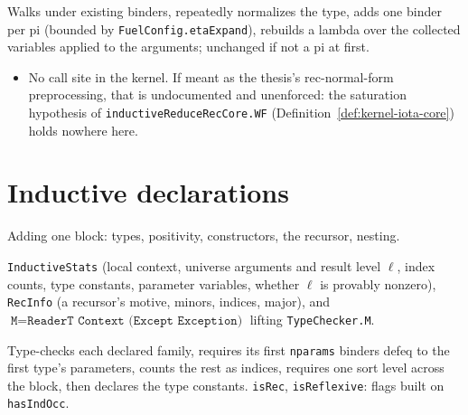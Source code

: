 \begin{definition}
\label{def:kernel-eta-expand}
\leanok
{}

 Walks under existing binders, repeatedly normalizes the type, adds one binder per
pi (bounded by \texttt{FuelConfig.etaExpand}), rebuilds a lambda over the collected variables
applied to the arguments; unchanged if not a pi at first.
\begin{itemize}
\item {} No call site in the kernel. If meant as the thesis's $\mathrm{rec}$-normal-form
preprocessing, that is undocumented and unenforced: the saturation hypothesis of
\texttt{inductiveReduceRecCore.WF} (Definition~\ref{def:kernel-iota-core}) holds nowhere here.
\end{itemize}
\end{definition}

\section{Inductive declarations}

Adding one block: types, positivity, constructors, the recursor, nesting.

\begin{definition}
\label{structure:kernel-addinductive-ctx}
\leanok
{}

 \texttt{InductiveStats} (local context, universe arguments and result level
$\ell$, index counts, type constants, parameter variables, whether $\ell$ is provably nonzero),
\texttt{RecInfo} (a recursor's motive, minors, indices, major), and $\texttt{M} =
\texttt{ReaderT Context (Except Exception)}$ lifting \texttt{TypeChecker.M}.
\end{definition}

\begin{definition}
\label{def:kernel-check-inductive-types}
\leanok
{}

 Type-checks each declared family, requires its first \texttt{nparams} binders
defeq to the first type's parameters, counts the rest as indices, requires one sort level across
the block, then declares the type constants. \texttt{isRec}, \texttt{isReflexive}: flags built on
\texttt{hasIndOcc}.
\end{definition}

